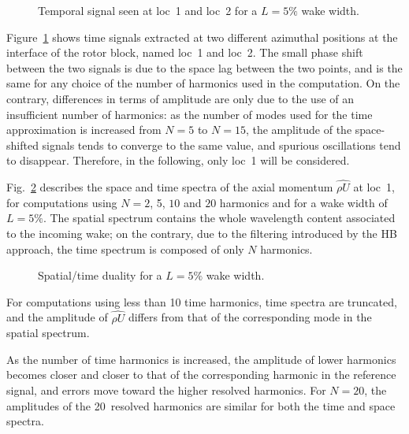 \begin{figure}[htp]
\centering
  \caption{Temporal signal seen at loc~1 and loc~2 for a $L=5\%$ wake width.}
  \label{fig:temp_signal}
\end{figure}
Figure~\ref{fig:temp_signal} shows time signals
extracted at two different azimuthal positions at 
the interface of the rotor block, named loc~1 and loc~2. 
The small phase shift between the two 
signals is due to the space lag between the two points, 
and is the same for any choice of the number of 
harmonics used in the computation. On the contrary, 
differences in terms of amplitude are only due 
to the use of an insufficient number of harmonics: 
as the number of modes used for the time 
approximation is increased from $N=5$ to $N=15$, 
the amplitude of the space-shifted signals 
tends to converge to the same value, and 
spurious oscillations tend to disappear. Therefore, in the following,
only loc~1 will be considered.

Fig.~\ref{fig:dualite_crit} describes the space and 
time spectra of the axial momentum $\widehat{\rho U}$ at loc~1, 
for computations using $N=2$, 5, $10$ and $20$ 
harmonics and for a wake width of $L=5\%$.
The spatial spectrum contains the whole wavelength 
content associated to the incoming wake; 
on the contrary, due to the filtering introduced 
by the HB approach, the time spectrum is composed of only $N$ harmonics.
\begin{figure}[htp]
\centering
{}
\caption{Spatial/time duality for a $L=5\%$ wake width.}
\label{fig:dualite_crit}
\end{figure}

For computations using less than 10 time harmonics, 
time spectra are truncated, and the amplitude of 
$\widehat{\rho U}$ differs from that of the corresponding mode in the spatial spectrum.

As the number of time harmonics is increased, 
the amplitude of lower harmonics becomes closer 
and closer to that of the corresponding harmonic 
in the reference signal, and errors move toward 
the higher resolved harmonics. For $N=20$, 
the amplitudes of the 20~resolved harmonics are 
similar for both the time and space spectra.

